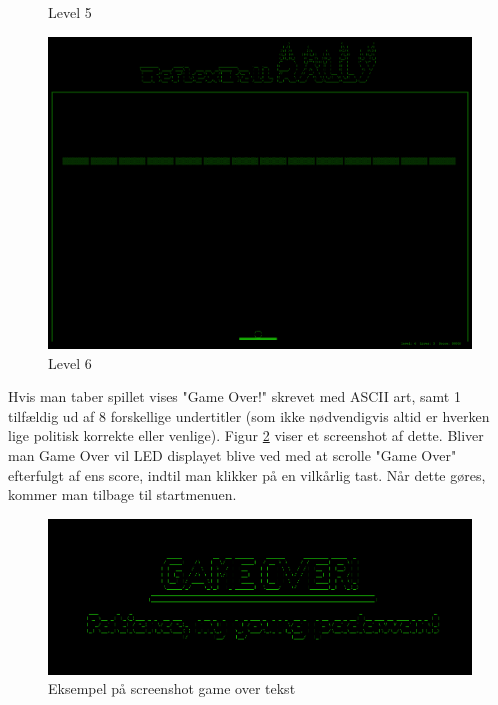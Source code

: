 \begin{figure}[h!]
\begin{minipage}[b]{0.32\textwidth}
\caption{Level 5}
\label{fig:level5}
\end{minipage}\hfill
\begin{minipage}[b]{0.32\textwidth}
\includegraphics[width=\linewidth]{figs/screenshots/level6.png}
\caption{Level 6}
\label{fig:level6}
\end{minipage}\hfill
\end{figure}
\newpage
Hvis man taber spillet vises "Game Over!" skrevet med ASCII art, samt 1 tilfældig ud af 8 forskellige undertitler (som ikke nødvendigvis altid er hverken lige politisk korrekte eller venlige). Figur \ref{fig:gameover_2} viser et screenshot af dette. Bliver man Game Over vil LED displayet blive ved med at scrolle "Game Over" efterfulgt af ens score, indtil man klikker på en vilkårlig tast. Når dette gøres, kommer man tilbage til startmenuen.\\

\begin{figure}[h!]
\centering
\includegraphics[scale=0.25]{figs/screenshots/gameover_crop.png}
\caption{Eksempel på screenshot game over tekst}
\label{fig:gameover_2}
\end{figure}

